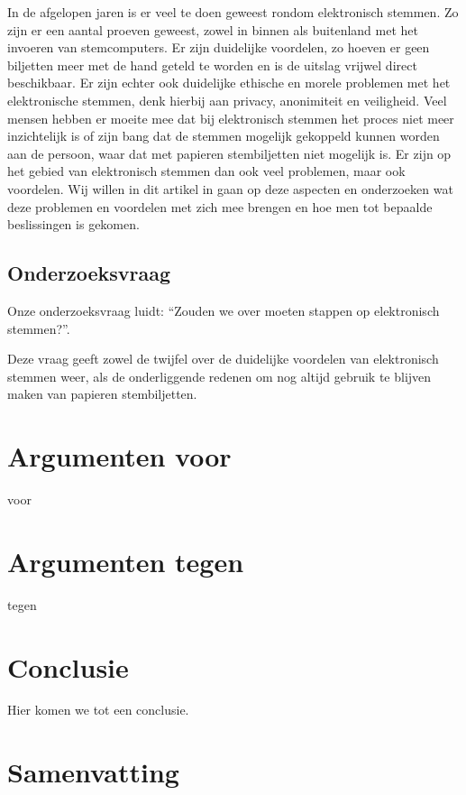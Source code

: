 \documentclass[a4paper]{article}
\begin{document}
In de afgelopen jaren is er veel te doen geweest rondom elektronisch stemmen.
Zo zijn er een aantal proeven geweest, zowel in binnen als buitenland met het invoeren van stemcomputers.
Er zijn duidelijke voordelen, zo hoeven er geen biljetten meer met de hand geteld te worden en is de uitslag vrijwel direct beschikbaar.
Er zijn echter ook duidelijke ethische en morele problemen met het elektronische stemmen, denk hierbij aan privacy, anonimiteit en veiligheid.
Veel mensen hebben er moeite mee dat bij elektronisch stemmen het proces niet meer inzichtelijk is of zijn bang dat de stemmen mogelijk gekoppeld kunnen worden aan de persoon, waar dat met papieren stembiljetten niet mogelijk is.
Er zijn op het gebied van elektronisch stemmen dan ook veel problemen, maar ook voordelen.
Wij willen in dit artikel in gaan op deze aspecten en onderzoeken wat deze problemen en voordelen met zich mee brengen en hoe men tot bepaalde beslissingen is gekomen.

\subsection{Onderzoeksvraag}

Onze onderzoeksvraag luidt: ``Zouden we over moeten stappen op elektronisch stemmen?''.

Deze vraag geeft zowel de twijfel over de duidelijke voordelen van elektronisch stemmen weer, als de onderliggende redenen om nog altijd gebruik te blijven maken van papieren stembiljetten.

\section{Argumenten voor}

voor

\section{Argumenten tegen}

tegen


\section{Conclusie}

Hier komen we tot een conclusie.

\newpage

\section{Samenvatting}

\newpage


\renewcommand\refname{Literatuur}

\end{document}
